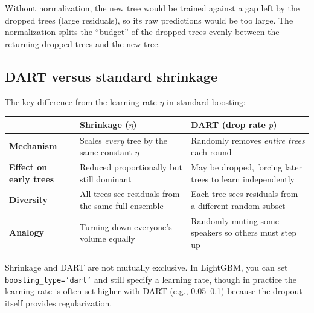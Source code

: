 \begin{intuition}
Without normalization, the new tree would be trained against a gap left by
the dropped trees (large residuals), so its raw predictions would be too
large.  The normalization splits the ``budget'' of the dropped trees evenly
between the returning dropped trees and the new tree.
\end{intuition}

\subsection*{DART versus standard shrinkage}

The key difference from the learning rate $\eta$ in standard boosting:

\begin{center}
\renewcommand{\arraystretch}{1.25}
\begin{tabular}{@{}lp{5.8cm}p{5.8cm}@{}}
\toprule
& \textbf{Shrinkage} ($\eta$) & \textbf{DART} (drop rate $p$) \\
\midrule
\textbf{Mechanism}
  & Scales \emph{every} tree by the same constant $\eta$
  & Randomly removes \emph{entire trees} each round \\
\textbf{Effect on early trees}
  & Reduced proportionally but still dominant
  & May be dropped, forcing later trees to learn independently \\
\textbf{Diversity}
  & All trees see residuals from the same full ensemble
  & Each tree sees residuals from a different random subset \\
\textbf{Analogy}
  & Turning down everyone's volume equally
  & Randomly muting some speakers so others must step up \\
\bottomrule
\end{tabular}
\end{center}

Shrinkage and DART are not mutually exclusive.  In LightGBM, you can set
\texttt{boosting\_type='dart'} and still specify a learning rate, though in
practice the learning rate is often set higher with DART (e.g., 0.05--0.1)
because the dropout itself provides regularization.

